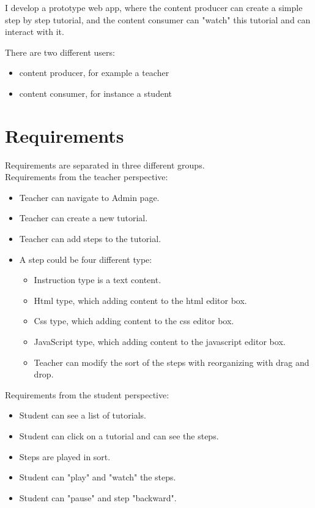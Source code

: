 \documentclass[11pt
              , a4paper
              , twoside
              , openright
              ]{report}
\begin{document}
I develop a prototype web app, where the content producer can create a simple step by step tutorial, and the content consumer can "watch" this tutorial and can interact with it.

There are two different users:
\begin{itemize}[noitemsep]
\item content producer, for example a teacher
\item content consumer, for instance a student
\end{itemize}

\section{Requirements}

Requirements are separated in three different groups.\\

\noindent Requirements from the teacher perspective:
\begin{itemize}[noitemsep]
\item Teacher can navigate to Admin page.
\item Teacher can create a new tutorial.
\item Teacher can add steps to the tutorial.
\item A step could be four different type:
\begin{itemize}[noitemsep]
\item Instruction type is a text content.
\item Html type, which adding content to the html editor box.
\item Css type, which adding content to the css editor box.
\item JavaScript type, which adding content to the javascript editor box.
\item Teacher can modify the sort of the steps with reorganizing with drag and drop.
\end{itemize}
\end{itemize}

\noindent Requirements from the student perspective:
\begin{itemize}[noitemsep]
\item Student can see a list of tutorials.
\item Student can click on a tutorial and can see the steps.
\item Steps are played in sort.
\item Student can "play" and "watch" the steps.
\item Student can "pause" and step "backward".
\end{itemize}
\end{document}
